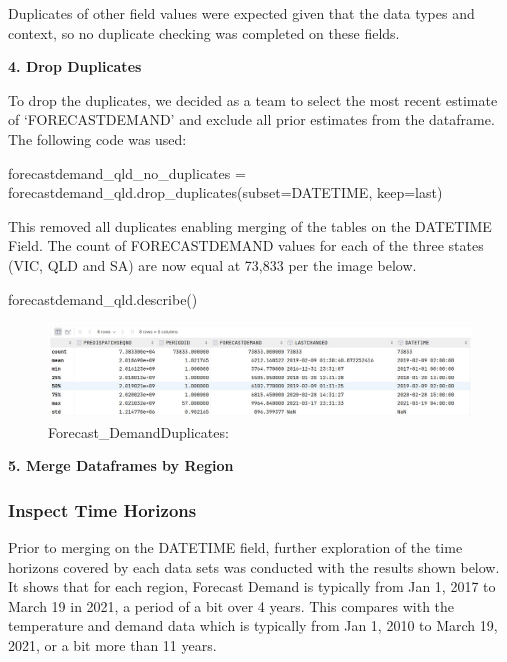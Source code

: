 \documentclass[
]{article}
\newenvironment{Shaded}{}{}
\newcommand{\NormalTok}[1]{#1}
\newcommand{\OperatorTok}[1]{\textcolor[rgb]{0.40,0.40,0.40}{#1}}
\newcommand{\StringTok}[1]{\textcolor[rgb]{0.25,0.44,0.63}{#1}}
\begin{document}
Duplicates of other field values were expected given that the data types
and context, so no duplicate checking was completed on these fields.

\textbf{4. Drop Duplicates}

To drop the duplicates, we decided as a team to select the most recent
estimate of `FORECASTDEMAND' and exclude all prior estimates from the
dataframe. The following code was used:

\begin{Shaded}
\begin{Highlighting}[]
\NormalTok{forecastdemand\_qld\_no\_duplicates }\OperatorTok{=}\NormalTok{ forecastdemand\_qld.drop\_duplicates(subset}\OperatorTok{=}\StringTok{\textquotesingle{}DATETIME\textquotesingle{}}\NormalTok{, keep}\OperatorTok{=}\StringTok{\textquotesingle{}last\textquotesingle{}}\NormalTok{)}
\end{Highlighting}
\end{Shaded}

This removed all duplicates enabling merging of the tables on the
DATETIME Field. The count of FORECASTDEMAND values for each of the three
states (VIC, QLD and SA) are now equal at 73,833 per the image below.

\begin{Shaded}
\begin{Highlighting}[]
\NormalTok{forecastdemand\_qld.describe()}
\end{Highlighting}
\end{Shaded}

\begin{figure}
\centering
\includegraphics{img/QLD_ForecastDemand_DuplicatesRemoved.jpg}
\caption{Forecast\_DemandDuplicates:}
\end{figure}

\textbf{5. Merge Dataframes by Region}

\subsubsection{Inspect Time Horizons}\label{inspect-time-horizons}

Prior to merging on the DATETIME field, further exploration of the time
horizons covered by each data sets was conducted with the results shown
below. It shows that for each region, Forecast Demand is typically from
Jan 1, 2017 to March 19 in 2021, a period of a bit over 4 years. This
compares with the temperature and demand data which is typically from
Jan 1, 2010 to March 19, 2021, or a bit more than 11 years.
\end{document}
